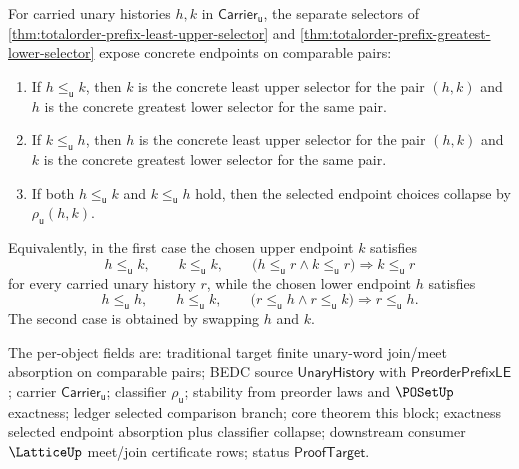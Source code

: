 \begin{theorem}
\label{thm:totalorder-prefix-selector-absorption-package}
For carried unary histories $h,k$ in $\mathsf{Carrier}_{\mathsf{u}}$, the
separate selectors of
\autoref{thm:totalorder-prefix-least-upper-selector} and
\autoref{thm:totalorder-prefix-greatest-lower-selector} expose concrete
endpoints on comparable pairs:
\begin{enumerate}
  \item If $h\le_{\mathsf{u}}k$, then $k$ is the concrete least upper selector
  for the pair $(h,k)$ and $h$ is the concrete greatest lower selector for the
  same pair.
  \item If $k\le_{\mathsf{u}}h$, then $h$ is the concrete least upper selector
  for the pair $(h,k)$ and $k$ is the concrete greatest lower selector for the
  same pair.
  \item If both $h\le_{\mathsf{u}}k$ and $k\le_{\mathsf{u}}h$ hold, then the
  selected endpoint choices collapse by $\rho_{\mathsf{u}}(h,k)$.
\end{enumerate}
Equivalently, in the first case the chosen upper endpoint $k$ satisfies
$$
h\le_{\mathsf{u}}k,
\qquad
k\le_{\mathsf{u}}k,
\qquad
\bigl(h\le_{\mathsf{u}}r\land k\le_{\mathsf{u}}r\bigr)
\Rightarrow k\le_{\mathsf{u}}r
$$
for every carried unary history $r$, while the chosen lower endpoint $h$
satisfies
$$
h\le_{\mathsf{u}}h,
\qquad
h\le_{\mathsf{u}}k,
\qquad
\bigl(r\le_{\mathsf{u}}h\land r\le_{\mathsf{u}}k\bigr)
\Rightarrow r\le_{\mathsf{u}}h.
$$
The second case is obtained by swapping $h$ and $k$.

The per-object fields are: traditional target finite unary-word join/meet
absorption on comparable pairs; BEDC source $\mathsf{UnaryHistory}$ with
$\mathsf{PreorderPrefixLE}$; carrier $\mathsf{Carrier}_{\mathsf{u}}$;
classifier $\rho_{\mathsf{u}}$; stability from preorder laws and $\POSetUp$
exactness; ledger selected comparison branch; core theorem this block;
exactness selected endpoint absorption plus classifier collapse; downstream
consumer $\LatticeUp$ meet/join certificate rows; status
$\mathsf{ProofTarget}$.
\end{theorem}
